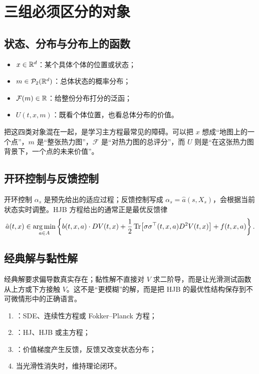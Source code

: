 \section*{三组必须区分的对象}

\subsection*{状态、分布与分布上的函数}

\begin{itemize}
  \item $x\in\mathbb{R}^d$：某个具体个体的位置或状态；
  \item $m\in\mathcal{P}_2(\mathbb{R}^d)$：总体状态的概率分布；
  \item $\mathcal F(m)\in\mathbb{R}$：给整份分布打分的泛函；
  \item $U(t,x,m)$：既看个体位置，也看总体分布的价值。
\end{itemize}

把这四类对象混在一起，是学习主方程最常见的障碍。可以把 $x$ 想成“地图上的一个点”，$m$ 是“整张热力图”，$\mathcal F$ 是“对热力图的总评分”，而 $U$ 则是“在这张热力图背景下，一个点的未来价值”。

\subsection*{开环控制与反馈控制}

开环控制 $\alpha_s$ 是预先给出的适应过程；反馈控制写成 $\alpha_s=\hat a(s,X_s)$，会根据当前状态实时调整。HJB 方程给出的通常正是最优反馈律
\[
\hat a(t,x)\in\operatorname*{arg\,min}_{a\in A}
\left\{b(t,x,a)\cdot D V(t,x)
+\frac12\operatorname{Tr}\!\left[\sigma\sigma^\top(t,x,a)D^2V(t,x)\right]+f(t,x,a)\right\}.
\]

\subsection*{经典解与黏性解}

经典解要求偏导数真实存在；黏性解不直接对 $V$ 求二阶导，而是让光滑测试函数从上方或下方接触 $V$。这不是“更模糊”的解，而是把 HJB 的最优性结构保存到不可微情形中的正确语言。

\begin{takeaway}[课程总纲]
\begin{enumerate}
  \item {}：SDE、连续性方程或 Fokker--Planck 方程；
  \item {}：HJ、HJB 或主方程；
  \item {}：价值梯度产生反馈，反馈又改变状态分布；
  \item 当光滑性消失时，维持理论闭环。
\end{enumerate}
\end{takeaway}

